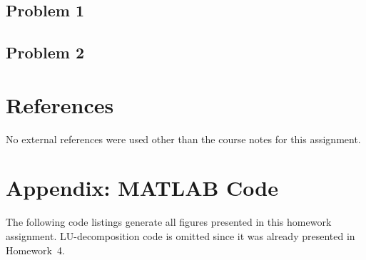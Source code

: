 \documentclass[11pt]{article}
\begin{document}
\subsection{Problem 1}

\subsection{Problem 2}

\section{References} %

No external references were used other than the course notes for this assignment.

\section*{Appendix: MATLAB Code} %

The following code listings generate all figures presented in this homework assignment. LU-decomposition code is omitted since it was already presented in Homework~4.


\end{document}
